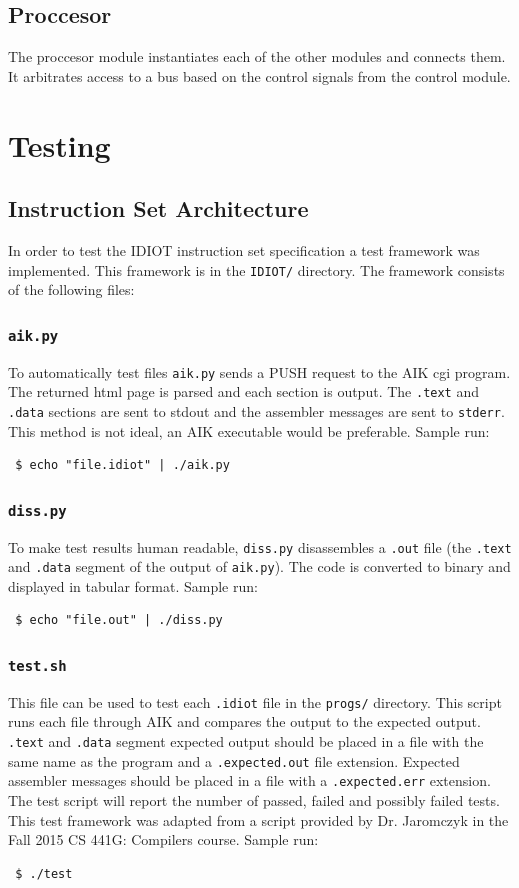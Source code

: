 \documentclass[conference]{IEEEtran}
\begin{document}
\subsection{Proccesor}
The proccesor module instantiates each of the other modules and connects them.
It arbitrates access to a bus based on the control signals from the control
module. 
\section{Testing}
\subsection{Instruction Set Architecture}
In order to test the IDIOT instruction set specification a test framework was
implemented. This framework is in the \texttt{IDIOT/} directory. The framework
consists of the following files:
\subsubsection{\texttt{aik.py}}
To automatically test files \texttt{aik.py} sends a PUSH request to the
AIK cgi program. The returned html page is parsed and each section is output.
The \texttt{.text} and \texttt{.data} sections are sent to stdout and the
assembler messages are sent to \texttt{stderr}. This method is not ideal, an
AIK executable would be preferable. Sample run:
\begin{verbatim}
 $ echo "file.idiot" | ./aik.py
\end{verbatim}
\subsubsection{\texttt{diss.py}}
To make test results human readable, \texttt{diss.py} disassembles a 
\texttt{.out} file (the \texttt{.text} and \texttt{.data} segment of the 
output of \texttt{aik.py}). The code is converted to binary and displayed in
tabular format. Sample run:
\begin{verbatim}
 $ echo "file.out" | ./diss.py
\end{verbatim}
\subsubsection{\texttt{test.sh}}
This file can be used to test each \texttt{.idiot} file in the \texttt{progs/}
directory. This script runs each file through AIK and compares the output to
the expected output. \texttt{.text} and \texttt{.data} segment expected
output should be placed in a file with the same name as the program and a 
\texttt{.expected.out} file extension. Expected assembler messages should
be placed in a file with a \texttt{.expected.err} extension. The test script
will report the number of passed, failed and possibly failed tests. This test
framework was adapted from a script provided by Dr. Jaromczyk in the Fall
2015 CS 441G: Compilers course. Sample run:
\begin{verbatim}
 $ ./test
\end{verbatim}
\end{document}
